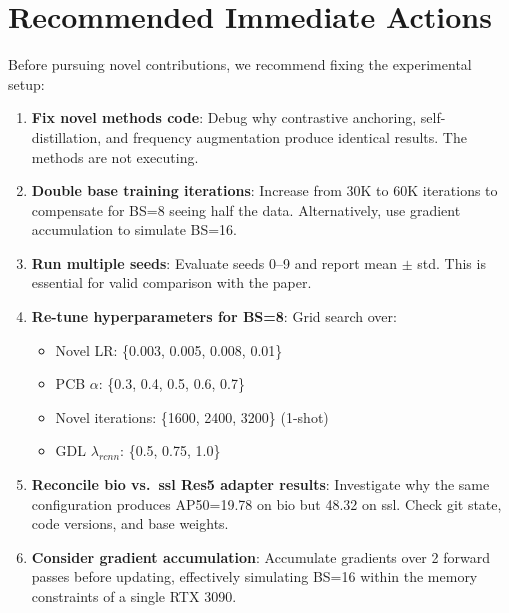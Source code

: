 \documentclass[11pt,a4paper]{article}
\begin{document}
\section{Recommended Immediate Actions}

Before pursuing novel contributions, we recommend fixing the experimental setup:

\begin{enumerate}
    \item \textbf{Fix novel methods code}: Debug why contrastive anchoring, self-distillation, and frequency augmentation produce identical results. The methods are not executing.

    \item \textbf{Double base training iterations}: Increase from 30K to 60K iterations to compensate for BS=8 seeing half the data. Alternatively, use gradient accumulation to simulate BS=16.

    \item \textbf{Run multiple seeds}: Evaluate seeds 0--9 and report mean $\pm$ std. This is essential for valid comparison with the paper.

    \item \textbf{Re-tune hyperparameters for BS=8}: Grid search over:
    \begin{itemize}[nosep]
        \item Novel LR: \{0.003, 0.005, 0.008, 0.01\}
        \item PCB $\alpha$: \{0.3, 0.4, 0.5, 0.6, 0.7\}
        \item Novel iterations: \{1600, 2400, 3200\} (1-shot)
        \item GDL $\lambda_{rcnn}$: \{0.5, 0.75, 1.0\}
    \end{itemize}

    \item \textbf{Reconcile bio vs.\ ssl Res5 adapter results}: Investigate why the same configuration produces AP50=19.78 on bio but 48.32 on ssl. Check git state, code versions, and base weights.

    \item \textbf{Consider gradient accumulation}: Accumulate gradients over 2 forward passes before updating, effectively simulating BS=16 within the memory constraints of a single RTX 3090.
\end{enumerate}
\end{document}
